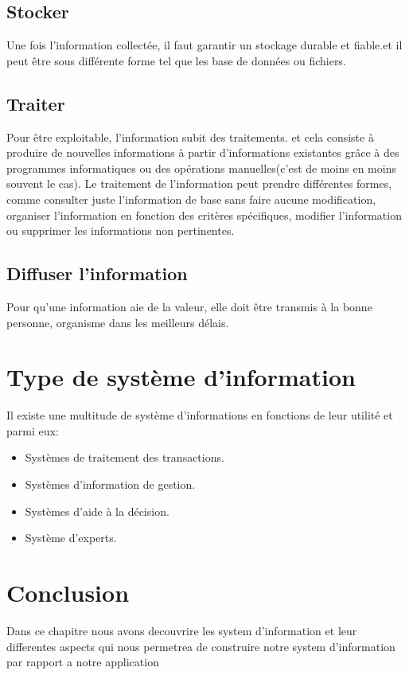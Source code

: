 \subsection{Stocker }
\par Une fois l’information collectée, il faut garantir un stockage durable et
fiable.et il peut être sous différente forme tel que les base de données ou
fichiers.\cite{ref13}

\subsection{Traiter }
\par Pour être exploitable, l’information subit des traitements. et cela
consiste à produire de nouvelles informations à partir d’informations
existantes grâce à des programmes informatiques ou des opérations
manuelles(c’est de moins en moins souvent le cas).
Le traitement de l’information peut prendre différentes formes, comme consulter
juste l’information de base sans faire aucune modification, organiser
l’information en fonction des critères spécifiques, modifier l’information ou
supprimer les informations non pertinentes.\cite{ref13}

\subsection{Diffuser l'information }
\par Pour qu’une information aie de la valeur, elle doit être transmis à la
bonne personne, organisme dans les meilleurs délais. 
\section{Type de système d'information }
\par Il existe une multitude de système d’informations en fonctions de leur utilité et parmi eux:
\begin{itemize}[label=\textbullet]
    \item Systèmes de traitement des transactions.
    \item Systèmes d'information de gestion.
    \item Systèmes d'aide à la décision.
    \item Système d'experts.\cite{ref14}
\end{itemize}




\section{Conclusion }

\par Dans ce chapitre nous avons decouvrire les system d'information et leur
differentes aspects qui nous permetrea de construire notre system d'information
par rapport a notre application
